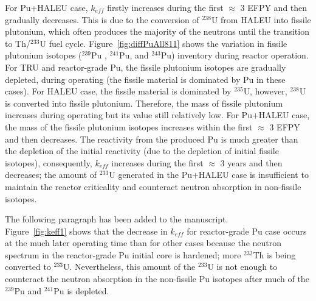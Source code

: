 \documentclass[answers,11pt]{exam}
\begin{document}
\begin{questions}
\begin{solution}
                 For Pu+HALEU case, $k_{eff}$ firstly increases during the first $\approx$ $3$ EFPY and then gradually decreases. This is due to the conversion of $^{238}$U from HALEU into fissile plutonium, which often produces the majority of the neutrons until the transition to Th/$^{233}$U fuel cycle. Figure~\ref{fig:diffPuAll811} shows the variation in fissile plutonium isotopes ($^{239}$Pu , $^{241}$Pu, and $^{243}$Pu) inventory during reactor operation. For TRU and reactor-grade Pu, the fissile plutonium isotopes are gradually depleted, during operating (the fissile material is dominated by Pu in these cases). For HALEU case, the fissile material is dominated by $^{235}$U, however, $^{238}$U is converted into fissile plutonium. Therefore, the mass of fissile plutonium increases during operating but its value still relatively low. For Pu+HALEU case, the mass of the fissile plutonium isotopes increases within the first $\approx$ $3$ EFPY and then decreases. The reactivity from the produced Pu is much greater than the depletion of the initial reactivity (due to the depletion of initial fissile isotopes), consequently, $k_{eff}$ increases during the first $\approx$ $3$ years and then decreases; the amount of $^{233}$U generated in the Pu+HALEU case is insufficient to maintain the reactor criticality and counteract neutron absorption in non-fissile isotopes.
                 
                 The following paragraph has been added to the manuscript.\\
                 
                 Figure~\ref{fig:keff1} shows that the decrease in $k_{eff}$ for reactor-grade Pu case occurs at the much later operating time than for other cases because the neutron spectrum in the reactor-grade Pu initial core is hardened; more $^{232}$Th is being converted to $^{233}$U. Nevertheless, this amount of the $^{233}$U is not enough to counteract the neutron absorption in the non-fissile Pu isotopes after much of the $^{239}$Pu and $^{241}$Pu is depleted.
                 
        \end{solution}


\end{questions}
\end{document}
